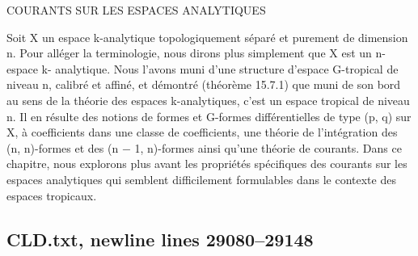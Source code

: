 \documentclass[
  10pt,
]{article}
\newenvironment{Shaded}{}{}
\newcommand{\NormalTok}[1]{#1}
\begin{document}
\begin{Shaded}
\begin{Highlighting}[]
\NormalTok{COURANTS SUR LES ESPACES ANALYTIQUES}




\NormalTok{   Soit X un espace k{-}analytique topologiquement séparé et purement de dimension n.}
\NormalTok{Pour alléger la terminologie, nous dirons plus simplement que X est un n{-}espace k{-}}
\NormalTok{analytique. Nous l’avons muni d’une structure d’espace G{-}tropical de niveau n, calibré}
\NormalTok{et affiné, et démontré (théorème 15.7.1) que muni de son bord au sens de la théorie des}
\NormalTok{espaces k{-}analytiques, c’est un espace tropical de niveau n.}
\NormalTok{   Il en résulte des notions de formes et G{-}formes différentielles de type (p, q) sur X, à}
\NormalTok{coefficients dans une classe de coefficients, une théorie de l’intégration des (n, n){-}formes}
\NormalTok{et des (n − 1, n){-}formes ainsi qu’une théorie de courants.}
\NormalTok{   Dans ce chapitre, nous explorons plus avant les propriétés spécifiques des courants}
\NormalTok{sur les espaces analytiques qui semblent difficilement formulables dans le contexte des}
\NormalTok{espaces tropicaux.}
\end{Highlighting}
\end{Shaded}

\subsection{CLD.txt, newline lines
29080--29148}\label{cld.txt-newline-lines-2908029148}
\end{document}
